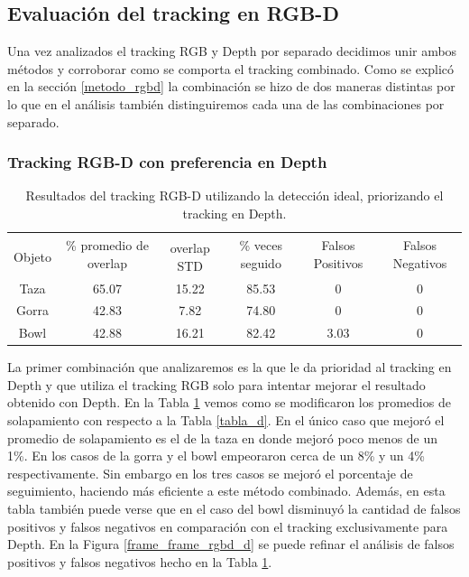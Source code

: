 \subsection{Evaluación del tracking en RGB-D}
Una vez analizados el tracking RGB y Depth por separado decidimos unir ambos métodos y corroborar como se comporta el tracking combinado. Como se explicó en la sección \ref{metodo_rgbd} la combinación se hizo de dos maneras distintas por lo que en el análisis también distinguiremos cada una de las combinaciones por separado.

\subsubsection*{Tracking RGB-D con preferencia en Depth}
\begin{table}[h]
    \begin{tabular}{|c|c|c|c|c|c|}
    \hline
    & \multirow{2}{2.4cm}{\% promedio de overlap} & & \multirow{2}{2cm}{\% veces seguido} & \multirow{2}{1.6cm}{Falsos Positivos} & \multirow{2}{1.6cm}{Falsos Negativos}\\
	Objeto & & overlap STD & & &\\
    \hline
    Taza   & 65.07      & 15.22       & 85.53             & 0                & 0\\
    \hline
    Gorra  & 42.83      &  7.82       & 74.80             & 0                & 0\\
    \hline
    Bowl   & 42.88      & 16.21       & 82.42             & 3.03             & 0\\
    \hline
    \end{tabular}
\caption{Resultados del tracking RGB-D utilizando la detección ideal, priorizando el tracking en Depth.}
\label{tabla_rgbd_d}
\end{table}

La primer combinación que analizaremos es la que le da prioridad al tracking en Depth y que utiliza el tracking RGB solo para intentar mejorar el resultado obtenido con Depth. En la Tabla \ref{tabla_rgbd_d} vemos como se modificaron los promedios de solapamiento con respecto a la Tabla \ref{tabla_d}. En el único caso que mejoró el promedio de solapamiento es el de la taza en donde mejoró poco menos de un 1\%. En los casos de la gorra y el bowl empeoraron cerca de un 8\% y un 4\% respectivamente. Sin embargo en los tres casos se mejoró el porcentaje de seguimiento, haciendo más eficiente a este método combinado. Además, en esta tabla también puede verse que en el caso del bowl disminuyó la cantidad de falsos positivos y falsos negativos en comparación con el tracking exclusivamente para Depth. En la Figura \ref{frame_frame_rgbd_d} se puede refinar el análisis de falsos positivos y falsos negativos hecho en la Tabla \ref{tabla_rgbd_d}.

